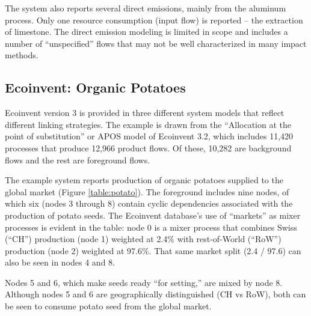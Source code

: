 The system also reports several direct emissions, mainly from the aluminum process.  Only one resource consumption (input flow) is reported -- the extraction of limestone. The direct emission modeling is limited in scope and includes a number of ``unspecified'' flows that may not be well characterized in many impact methods.


\subsection{Ecoinvent: Organic Potatoes}



Ecoinvent version 3 is provided in three different system models that reflect different linking strategies.  The example is drawn from the ``Allocation at the point of substitution'' or APOS model of Ecoinvent 3.2, which includes 11,420 processes that produce 12,966 product flows.  Of these, 10,282 are background flows and the rest are foreground flows.

The example system reports production of organic potatoes supplied to the global market (Figure \ref{table:potato}).  The foreground includes nine nodes, of which six (nodes 3 through 8) contain cyclic dependencies associated with the production of potato seeds.  The Ecoinvent database's use of ``markets'' as mixer processes is evident in the table: node 0 is a mixer process that combines Swiss (``CH'') production (node 1) weighted at 2.4\%  with rest-of-World (``RoW'') production (node 2) weighted at 97.6\%.  That same market split (2.4 / 97.6) can also be seen in nodes 4 and 8.

Nodes 5 and 6, which make seeds ready ``for setting,'' are mixed by node 8. Although nodes 5 and 6 are geographically distinguished (CH vs RoW), both can be seen to consume potato seed from the global market.

